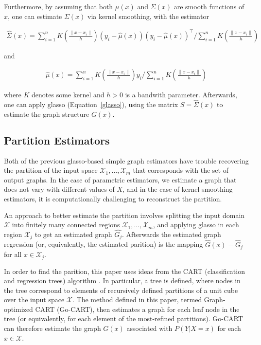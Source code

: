 \documentclass[12pt]{article}
\begin{document}
Furthermore, by assuming that both $\mu(x)$ and $\Sigma(x)$ are smooth
functions of $x$, one can estimate $\Sigma(x)$ via kernel smoothing,
with the estimator

\begin{align}
    \hat{\Sigma}(x) = \sum_{i=1}^n K \left( \frac{\|x-x_i\|}{h} \right) (y_i - \hat{\mu}(x)) (y_i - \hat{\mu}(x))^{\top} / \sum_{i=1}^n K \left( \frac{\| x - x_i \|}{h} \right)
\end{align}

and

\begin{align}
    \hat{\mu}(x) = \sum_{i=1}^n K\left( \frac{\|x-x_i\|}{h} \right) y_i / \sum_{i=1}^n K\left( \frac{\|x-x_i\|}{h} \right)
\end{align}

where $K$ denotes some kernel and $h>0$ is a bandwith
parameter. Afterwards, one can apply glasso (Equation~\ref{glasso}),
using the matrix $S = \hat{\Sigma}(x)$ to estimate the graph structure
$G(x)$.

\subsection{Partition Estimators}

Both of the previous glasso-based simple graph estimators have trouble
recovering the partition of the input space
$\mathcal{X}_1,\ldots,\mathcal{X}_m$ that corresponds with the set of
output graphs. In the case of parametric estimators, we estimate a
graph that does not vary with different values of $X$, and in the case
of kernel smoothing estimators, it is computationally challenging to
reconstruct the partition.

An approach to better estimate the partition involves splitting the
input domain $\mathcal{X}$ into finitely many connected regions
$\mathcal{X}_1,\ldots,\mathcal{X}_m$, and applying glasso in each
region $\mathcal{X}_j$ to get an estimated graph
$\hat{G_j}$. Afterwards the estimated graph regression (or,
equivalently, the estimated parition) is the mapping $\hat{G}(x) =
\hat{G}_j$ for all $x \in \mathcal{X}_j$.

In order to find the parition, this paper uses ideas from the CART
(classification and regression trees) algorithm
\cite{breiman1993classification}. In particular, a tree is defined,
where nodes in the tree correspond to elements of recursively defined
partitions of a unit cube over the input space $\mathcal{X}$. The
method defined in this paper, termed Graph-optimized CART (Go-CART),
then estimates a graph for each leaf node in the tree (or
equivalently, for each element of the most-refined
partitions). Go-CART can therefore estimate the graph $G(x)$
associated with $P(Y | X=x)$ for each $x \in \mathcal{X}$.
\end{document}
